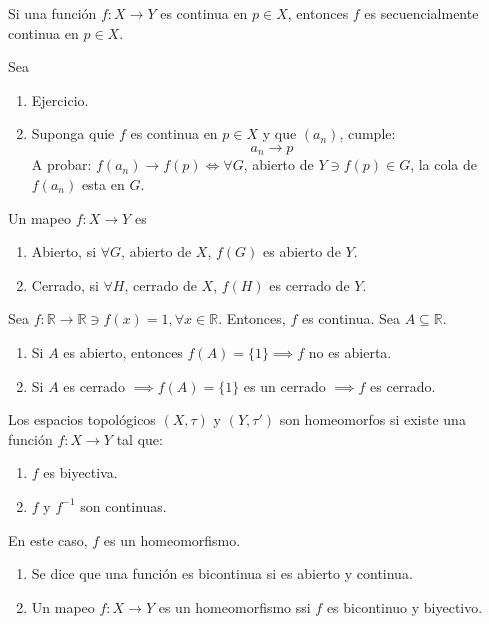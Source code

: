 \begin{teorema}
    Si una función $f:X\to Y$ es continua en $p\in X$, entonces $f$ es secuencialmente continua en $p\in X$. 
    \begin{sol}
        Sea 
        \begin{enumerate}
            \item Ejercicio. 
            \item Suponga quie $f$ es continua en $p\in X$ y que $(a_n)$, cumple: 
            $$a_n\to p$$
            A probar: $f(a_n)\to f(p)\iff \forall G$, abierto de $Y\ni f(p)\in G$, la cola de $f(a_n)$ esta en $G$. 
        \end{enumerate}
    \end{sol}
\end{teorema}
\begin{definicion}
    Un mapeo $f:X\to Y$ es 
    \begin{enumerate}
        \item Abierto, si $\forall G$, abierto de $X$, $f(G)$ es abierto de $Y$. 
        \item Cerrado, si $\forall H$, cerrado de $X$, $f(H)$ es cerrado de $Y$. 
    \end{enumerate}
\end{definicion}
\begin{ejemplo}
    Sea $f:\mathbb{R}\to \mathbb{R}\ni f(x)=1,\forall x\in \mathbb{R}$. Entonces, $f$ es continua. Sea $A\subseteq \mathbb{R}$. 
    \begin{enumerate}
        \item Si $A$ es abierto, entonces $f(A)=\{1\}\implies f$ no es abierta. 
        \item Si $A$ es cerrado $\implies f(A)=\{1\}$ es un cerrado $\implies f$ es cerrado. 
    \end{enumerate}
\end{ejemplo}

\begin{definicion}
    Los espacios topológicos $(X,\tau)$ y $(Y,\tau')$ son homeomorfos si existe una función $f:X\to Y$ tal que: 
    \begin{enumerate}
        \item $f$ es biyectiva. 
        \item $f$ y $f^{-1}$ son continuas.
    \end{enumerate}
    En este caso, $f$ es un homeomorfismo. 
\end{definicion}

\begin{nota}
    \begin{enumerate}
        \item Se dice que una función es bicontinua si es abierto y continua. 
        \item Un mapeo $f:X\to Y$ es un homeomorfismo ssi $f$ es bicontinuo y biyectivo.
    \end{enumerate}
    
\end{nota}

